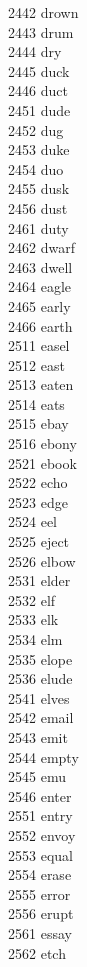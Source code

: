 2442 drown \\
2443 drum \\
2444 dry \\
2445 duck \\
2446 duct \\
2451 dude \\
2452 dug \\
2453 duke \\
2454 duo \\
2455 dusk \\
2456 dust \\
2461 duty \\
2462 dwarf \\
2463 dwell \\
2464 eagle \\
2465 early \\
2466 earth \\
2511 easel \\
2512 east \\
2513 eaten \\
2514 eats \\
2515 ebay \\
2516 ebony \\
2521 ebook \\
2522 echo \\
2523 edge \\
2524 eel \\
2525 eject \\
2526 elbow \\
2531 elder \\
2532 elf \\
2533 elk \\
2534 elm \\
2535 elope \\
2536 elude \\
2541 elves \\
2542 email \\
2543 emit \\
2544 empty \\
2545 emu \\
2546 enter \\
2551 entry \\
2552 envoy \\
2553 equal \\
2554 erase \\
2555 error \\
2556 erupt \\
2561 essay \\
2562 etch \\
